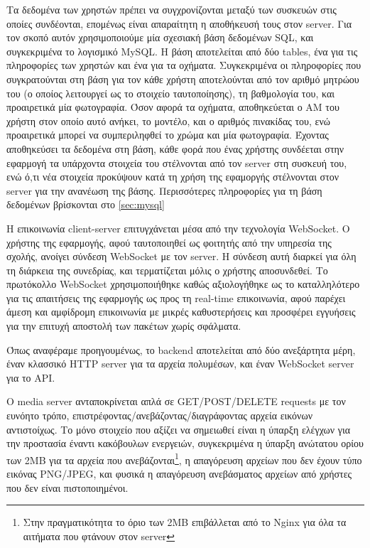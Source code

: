 \documentclass[../thesis.tex]{subfiles}
\begin{document}
\bigskip

Τα δεδομένα των χρηστών πρέπει να συγχρονίζονται μεταξύ των συσκευών στις οποίες συνδέονται, επομένως είναι απαραίτητη η αποθήκευσή τους στον server.
Για τον σκοπό αυτόν χρησιμοποιούμε μία σχεσιακή βάση δεδομένων SQL, και συγκεκριμένα το λογισμικό MySQL.
Η βάση αποτελείται από δύο tables, ένα για τις πληροφορίες των χρηστών και ένα για τα οχήματα.
Συγκεκριμένα οι πληροφορίες που συγκρατούνται στη βάση για τον κάθε χρήστη αποτελούνται από τον αριθμό μητρώου του (ο οποίος λειτουργεί ως το στοιχείο ταυτοποίησης), τη βαθμολογία του, και προαιρετικά μία φωτογραφία.
Όσον αφορά τα οχήματα, αποθηκεύεται ο ΑΜ του χρήστη στον οποίο αυτό ανήκει, το μοντέλο, και ο αριθμός πινακίδας του, ενώ προαιρετικά μπορεί να συμπεριληφθεί το χρώμα και μία φωτογραφία.
Έχοντας αποθηκεύσει τα δεδομένα στη βάση, κάθε φορά που ένας χρήστης συνδέεται στην εφαρμογή τα υπάρχοντα στοιχεία του στέλνονται από τον server στη συσκευή του, ενώ ό,τι νέα στοιχεία προκύψουν κατά τη χρήση της εφαμοργής στέλνονται στον server για την ανανέωση της βάσης.
Περισσότερες πληροφορίες για τη βάση δεδομένων βρίσκονται στο \autoref{sec:mysql}

\bigskip

Η επικοινωνία client-server επιτυγχάνεται μέσα από την τεχνολογία WebSocket.
Ο χρήστης της εφαρμογής, αφού ταυτοποιηθεί ως φοιτητής από την υπηρεσία της σχολής, ανοίγει σύνδεση WebSocket με τον server.
Η σύνδεση αυτή διαρκεί για όλη τη διάρκεια της συνεδρίας, και τερματίζεται μόλις ο χρήστης αποσυνδεθεί.
Το πρωτόκολλο WebSocket χρησιμοποιήθηκε καθώς αξιολογήθηκε ως το καταλληλότερο για τις απαιτήσεις της εφαρμογής ως προς τη real-time επικοινωνία, αφού παρέχει άμεση και αμφίδρομη επικοινωνία με μικρές καθυστερήσεις και προσφέρει εγγυήσεις για την επιτυχή αποστολή των πακέτων χωρίς σφάλματα.

\bigskip

Όπως αναφέραμε προηγουμένως, το backend αποτελείται από δύο ανεξάρτητα μέρη, έναν κλασσικό HTTP server για τα αρχεία πολυμέσων, και έναν WebSocket server για το API.

Ο media server ανταποκρίνεται απλά σε GET/POST/DELETE requests με τον ευνόητο τρόπο, επιστρέφοντας/ανεβάζοντας/διαγράφοντας αρχεία εικόνων αντιστοίχως.
Το μόνο στοιχείο που αξίζει να σημειωθεί είναι η ύπαρξη ελέγχων για την προστασία έναντι κακόβουλων ενεργειών, συγκεκριμένα η ύπαρξη ανώτατου ορίου των 2MB για τα αρχεία που ανεβάζονται\footnote{Στην πραγματικότητα το όριο των 2MB επιβάλλεται από το Nginx για όλα τα αιτήματα που φτάνουν στον server}, η απαγόρευση αρχείων που δεν έχουν τύπο εικόνας PNG/JPEG, και φυσικά η απαγόρευση ανεβάσματος αρχείων από χρήστες που δεν είναι πιστοποιημένοι.
\end{document}
